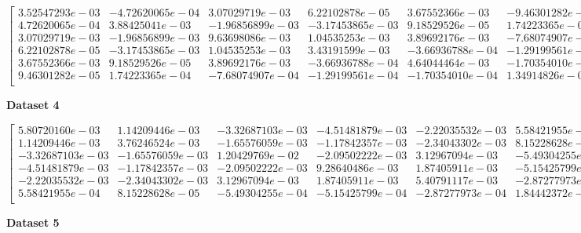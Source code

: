 \documentclass{article}
\begin{document}
\begin{equation}
    \begin{bmatrix}
        3.52547293e-03 & -4.72620065e-04 & 3.07029719e-03  & 6.22102878e-05  & 3.67552366e-03  & -9.46301282e-05 \\
        4.72620065e-04 & 3.88425041e-03  & -1.96856899e-03 & -3.17453865e-03 & 9.18529526e-05  & 1.74223365e-04  \\
        3.07029719e-03 & -1.96856899e-03 & 9.63698086e-03  & 1.04535253e-03  & 3.89692176e-03  & -7.68074907e-04 \\
        6.22102878e-05 & -3.17453865e-03 & 1.04535253e-03  & 3.43191599e-03  & -3.66936788e-04 & -1.29199561e-04 \\
        3.67552366e-03 & 9.18529526e-05  & 3.89692176e-03  & -3.66936788e-04 & 4.64044464e-03  & -1.70354010e-04 \\
        9.46301282e-05 & 1.74223365e-04  & -7.68074907e-04 & -1.29199561e-04 & -1.70354010e-04 & 1.34914826e-04  \\
    \end{bmatrix}
\end{equation}

\noindent\textbf{Dataset 4}

\begin{equation}
    \begin{bmatrix}
        5.80720160e-03  & 1.14209446e-03  & -3.32687103e-03 & -4.51481879e-03 & -2.22035532e-03 & 5.58421955e-04  \\
        1.14209446e-03  & 3.76246524e-03  & -1.65576059e-03 & -1.17842357e-03 & -2.34043302e-03 & 8.15228628e-05  \\
        -3.32687103e-03 & -1.65576059e-03 & 1.20429769e-02  & -2.09502222e-03 & 3.12967094e-03  & -5.49304255e-04 \\
        -4.51481879e-03 & -1.17842357e-03 & -2.09502222e-03 & 9.28640486e-03  & 1.87405911e-03  & -5.15425799e-04 \\
        -2.22035532e-03 & -2.34043302e-03 & 3.12967094e-03  & 1.87405911e-03  & 5.40791117e-03  & -2.87277973e-04 \\
        5.58421955e-04  & 8.15228628e-05  & -5.49304255e-04 & -5.15425799e-04 & -2.87277973e-04 & 1.84442372e-04  \\
    \end{bmatrix}
\end{equation}

\noindent\textbf{Dataset 5}
\end{document}
